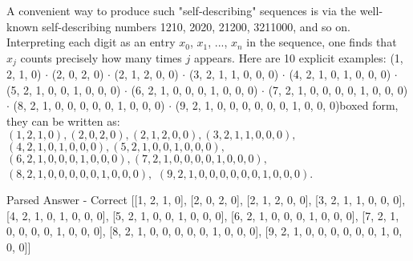 
\begingroup\raggedleft
\begin{gpt}{\ooneheader}
A convenient way to produce such "self-describing" sequences is via the well-known self-describing numbers 1210, 2020, 21200, 3211000, and so on.  Interpreting each digit as an entry $x_0$, $x_1$, ..., $x_n$ in the sequence, one finds that $x_j$ counts precisely how many times $j$ appears.  Here are 10 explicit examples:
(1, 2, 1, 0)  $\cdot$ (2, 0, 2, 0)  $\cdot$ (2, 1, 2, 0, 0)  $\cdot$ (3, 2, 1, 1, 0, 0, 0)  $\cdot$ (4, 2, 1, 0, 1, 0, 0, 0)  $\cdot$ (5, 2, 1, 0, 0, 1, 0, 0, 0)  $\cdot$ (6, 2, 1, 0, 0, 0, 1, 0, 0, 0)  $\cdot$ (7, 2, 1, 0, 0, 0, 0, 1, 0, 0, 0)  $\cdot$ (8, 2, 1, 0, 0, 0, 0, 0, 1, 0, 0, 0)  $\cdot$ (9, 2, 1, 0, 0, 0, 0, 0, 0, 1, 0, 0, 0)\n\nIn boxed form, they can be written as:\n
$\boxed{(1,2,1,0), (2,0,2,0), (2,1,2,0,0), (3,2,1,1,0,0,0),}$
$\boxed{(4,2,1,0,1,0,0,0), (5,2,1,0,0,1,0,0,0),}$
$\boxed{(6,2,1,0,0,0,1,0,0,0),(7,2,1,0,0,0,0,1,0,0,0),}$
$\boxed{(8,2,1,0,0,0,0,0,1,0,0,0),}$
$\boxed{(9,2,1,0,0,0,0,0,0,1,0,0,0)}.$
\end{gpt}
\endgroup

\begin{parsecheckcorrect}{Parsed Answer - Correct}
[[1, 2, 1, 0], [2, 0, 2, 0], [2, 1, 2, 0, 0], [3, 2, 1, 1, 0, 0, 0], [4, 2, 1, 0, 1, 0, 0, 0], [5, 2, 1, 0, 0, 1, 0, 0, 0], [6, 2, 1, 0, 0, 0, 1, 0, 0, 0], [7, 2, 1, 0, 0, 0, 0, 1, 0, 0, 0], [8, 2, 1, 0, 0, 0, 0, 0, 1, 0, 0, 0], [9, 2, 1, 0, 0, 0, 0, 0, 0, 1, 0, 0, 0]]
\end{parsecheckcorrect}
